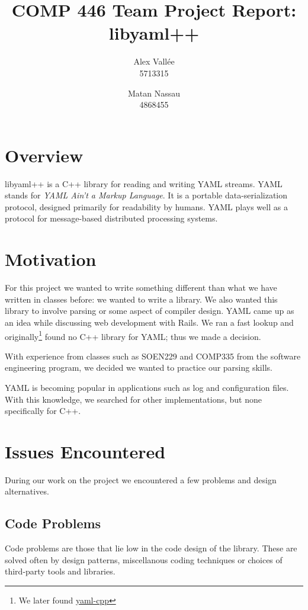 \documentclass{article}
\author{Alex Vall\'ee\\5713315  \and Matan Nassau\\4868455}
\title{COMP 446 Team Project Report:  libyaml++}
\begin{document}
\maketitle

\tableofcontents
\pagebreak

\section{Overview}
libyaml++ is a C++ library for reading and writing YAML streams.  YAML stands
for \emph{YAML Ain't a Markup Language}.  It is a portable data-serialization
protocol, designed primarily for readability by humans.  YAML plays well as a
protocol for message-based distributed processing systems.

\section{Motivation}
For this project we wanted to write something different than what we have 
written in classes before:  we wanted to write a library.  We also wanted this 
library to involve parsing or some aspect of compiler design.  YAML came up as 
an idea while discussing web development with Rails.  We ran a fast lookup and 
originally\footnote{We later found 
\href{http://code.google.com/p/yaml-cpp/}{yaml-cpp} } found no C++ library 
for YAML;  thus we made a decision.

With experience from classes such as SOEN229 and COMP335 from the software
engineering program, we decided we wanted to practice our parsing skills.

YAML is becoming popular in applications such as log and configuration files.
With this knowledge, we searched for other implementations, but none
specifically for C++.

\section{Issues Encountered}
During our work on the project we encountered a few problems and design alternatives.

\subsection{Code Problems}
Code problems are those that lie low in the code design of the library.  These 
are solved often by design patterns, miscellanous coding techniques or choices 
of third-party tools and libraries.
\end{document}
